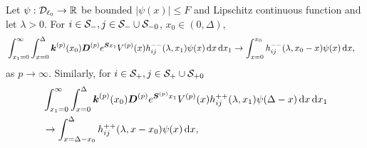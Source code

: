 
\begin{lem}\label{lem: ppp}
	Let \(\psi:\mathcal{D}_{\ell_0}\to \mathbb R\) be bounded \(|\psi(x)|\leq F\) and Lipschitz continuous function and let \(\lambda >0\). For \(i\in\mathcal S_-,j\in\mathcal S_-\cup\mathcal{S}_{-0}\), \(x_0\in(0,\Delta)\), 
	\begin{align}
		&\int_{x_1=0}^\infty \int_{x=0}^{\Delta}\boldsymbol k^{(p)}(x_0) \boldsymbol D^{(p)} e^{\boldsymbol S x_1} V^{(p)}(x) h_{ij}^{--}(\lambda, x_1) \psi(x) \, \mathrm{d} x \, \mathrm{d} x_1  
		\to \int_{x=0}^{x_0} h_{ij}^{--}(\lambda,x_0-x)\psi(x)\, \mathrm{d} x, \label{eqn: LLLlllL}
	\end{align}
	as \(p\to\infty\). Similarly, for \(i\in\mathcal S_+,j\in\mathcal S_+\cup\mathcal{S}_{+0}\)
	\begin{align}
		&\int_{x_1=0}^\infty \int_{x=0}^{\Delta}\boldsymbol k^{(p)}(x_0) \boldsymbol D^{(p)} e^{\boldsymbol S^{(p)} x_1} V^{(p)}(x) h_{ij}^{++}(\lambda, x_1) \psi(\Delta-x) \, \mathrm{d} x \, \mathrm{d} x_1  \nonumber 
		\\&\to\int_{x=\Delta-x_0}^{\Delta} h_{ij}^{++}(\lambda,x-x_0)\psi(x)\, \mathrm{d} x, \label{eqn: LLLlllL2222}
	\end{align}
\end{lem}
